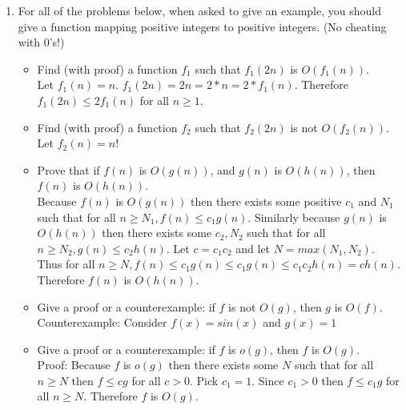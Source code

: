 \documentclass[11pt]{article}
\begin{document}
\begin{enumerate}
$$
\begin{array}{cc|c|c|c|c|c|}
A & B & O & o & \Omega & \omega & \Theta \\ \hline
\log{n} & \log(n^2) & yes & no & yes & no & yes \\ \hline
\log (n!) & \log(n^n) & yes & no & yes & no & yes \\ \hline
\sqrt[3]{n} & (\log n)^{6} & no & no & yes & yes & no \\ \hline
n^22^n & 3^n & yes & yes & no & no & no \\ \hline
(n^2)! & n^n & no & no & yes & yes & no \\ \hline
{n^2 \over \log{n}} & n \log(n^2) & no & no  & yes & yes & no\\ \hline
(\log n)^{\log n} & {n \over \log(n)} & no & no & yes & yes & no \hline
100n + \log n & (\log n)^{3} + n & yes & no & yes & no & yes \hline
\end{array}
$$

\item 
For all of the problems below, when asked to give an example, you
should give a function mapping positive integers to positive integers.
(No cheating with 0's!)
\begin{itemize}
\item Find (with proof) a function $f_1$ such that $f_1(2n)$ is $O(f_1(n))$. \\
Let $f_1(n)=n$. $f_1(2n)= 2n = 2*n =2*f_1(n)$. Therefore $f_1(2n) \leq 2 f_1(n)$ for all $n\geq 1$.
\item Find (with proof) a function $f_2$ such that $f_2(2n)$ is not $O(f_2(n))$. \\
Let $f_2(n) = n!$
\item Prove that if $f(n)$ is $O(g(n))$, and $g(n)$ is $O(h(n))$, then 
$f(n)$ is $O(h(n))$.  \\
Because $f(n)$ is $O(g(n))$ then there exists some positive $c_1$ and $N_1$ such that for all $n \geq N_1, f(n) \leq c_1g(n)$. Similarly because $g(n)$ is $O(h(n))$ then there exists some $c_2,  N_2$ such that for all $n\geq N_2, g(n) \leq c_2h(n)$. Let $c=c_1c_2$ and let $N = max(N_1, N_2)$. Thus for all $n \geq N, f(n) \leq c_1g(n) \leq c_1g(n) \leq c_1c_2h(n) = ch(n)$. Therefore $f(n)$ is $O(h(n))$.
\item Give a proof or a counterexample:  if $f$ is not $O(g)$, then $g$ is $O(f)$.  \\
Counterexample: Consider $f(x)=sin(x)$ and $g(x)=1$
\item Give a proof or a counterexample:  if $f$ is $o(g)$, then $f$ is $O(g)$. \\
Proof: Because $f$ is $o(g)$ then there exists some $N$ such that for all $n \geq N$ then $f \leq cg$ for all $c>0$. Pick $c_1=1$. Since $c_1>0$ then $f \leq c_1g$ for all $n \geq N$. Therefore $f$ is $O(g)$.
 \end{itemize}


\end{enumerate}
\end{document}
